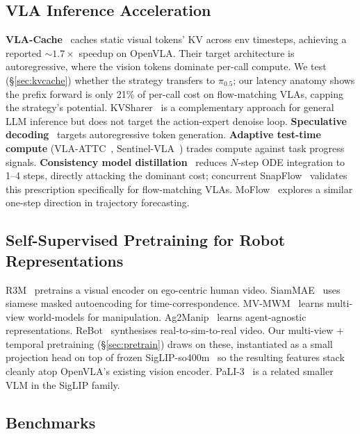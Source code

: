\documentclass{article}
\begin{document}
\subsection{VLA Inference Acceleration}

\textbf{VLA-Cache}~\cite{wang2025vlacache} caches static visual tokens' KV across env timesteps, achieving a reported \(\sim 1.7\times\) speedup on OpenVLA. Their target architecture is autoregressive, where the vision tokens dominate per-call compute. We test (\S\ref{sec:kvcache}) whether the strategy transfers to \(\pi_{0.5}\); our latency anatomy shows the prefix forward is only 21\% of per-call cost on flow-matching VLAs, capping the strategy's potential. KVSharer~\cite{kvsharer2024} is a complementary approach for general LLM inference but does not target the action-expert denoise loop. \textbf{Speculative decoding}~\cite{leviathan2023speculative} targets autoregressive token generation. \textbf{Adaptive test-time compute} (VLA-ATTC~\cite{vlaattc2026}, Sentinel-VLA~\cite{sentinelvla2026}) trades compute against task progress signals. \textbf{Consistency model distillation}~\cite{salimans2022progressive,song2023consistency,lu2024simpleconsistency} reduces \(N\)-step ODE integration to 1--4 steps, directly attacking the dominant cost; concurrent SnapFlow~\cite{snapflow2026} validates this prescription specifically for flow-matching VLAs. MoFlow~\cite{moflow2025} explores a similar one-step direction in trajectory forecasting.

\subsection{Self-Supervised Pretraining for Robot Representations}

R3M~\cite{nair2022r3m} pretrains a visual encoder on ego-centric human video. SiamMAE~\cite{gupta2023siammae} uses siamese masked autoencoding for time-correspondence. MV-MWM~\cite{seo2023multiview} learns multi-view world-models for manipulation. Ag2Manip~\cite{ag2manip2024} learns agent-agnostic representations. ReBot~\cite{rebot2025} synthesises real-to-sim-to-real video. Our multi-view + temporal pretraining (\S\ref{sec:pretrain}) draws on these, instantiated as a small projection head on top of frozen SigLIP-so400m~\cite{zhai2023siglip} so the resulting features stack cleanly atop OpenVLA's existing vision encoder. PaLI-3~\cite{chen2023pali3} is a related smaller VLM in the SigLIP family.

\subsection{Benchmarks}
\end{document}
